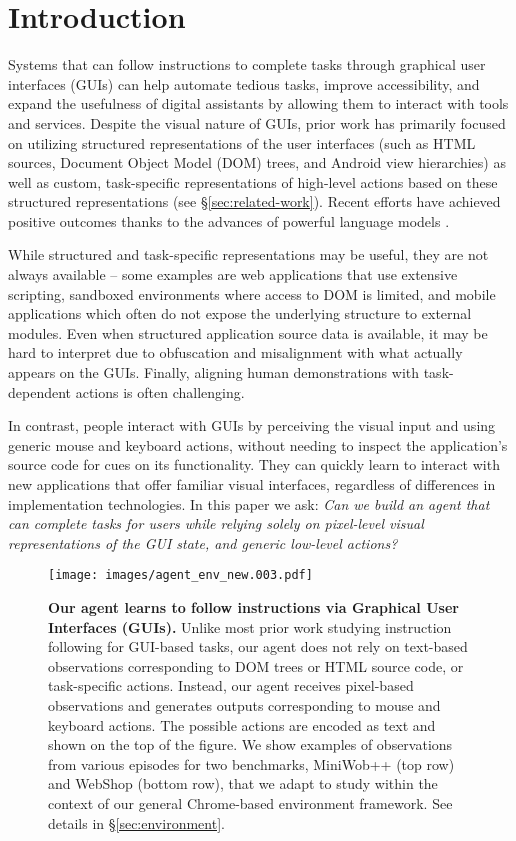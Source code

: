 \section{Introduction}
\label{sec:introduction}

Systems that can follow instructions to complete tasks through graphical user interfaces (GUIs) can help automate tedious tasks,
improve accessibility, and expand the usefulness of digital assistants by allowing them to interact with tools and services.
Despite the visual nature of GUIs, prior work has primarily focused on utilizing structured representations of the user interfaces (such as HTML sources, Document Object Model (DOM) trees, and Android view hierarchies) as well as custom, task-specific representations of high-level actions based on these structured representations (see \S\ref{sec:related-work}).
Recent efforts have achieved positive outcomes thanks to the advances of powerful language models \citep{gur2022understanding,kim2023language, yao2022webshop}.

While structured and task-specific representations may be useful, they are not always available -- some examples are web applications that use extensive scripting, sandboxed environments where access to DOM is limited, and mobile applications which often do not expose the underlying structure to external modules. Even when structured application source data is available, it may be hard to interpret due to obfuscation and misalignment with what actually appears on the GUIs.
Finally, aligning human demonstrations with task-dependent actions is often challenging.

In contrast, people interact with GUIs by perceiving the visual input and using generic mouse and keyboard actions, without needing to inspect the application's source code for cues on its functionality. They can quickly learn to interact with new applications that offer familiar visual interfaces, regardless of differences in implementation technologies. In this paper we ask: \emph{Can we build an agent that can complete tasks for users while relying solely on pixel-level visual representations of the GUI state, and generic low-level actions?}

\begin{figure}[t!]
    \centering
    \texttt{[image: images/agent\_env\_new.003.pdf]}
    \caption{\textbf{Our agent learns to follow instructions via Graphical User Interfaces (GUIs).} Unlike most prior work studying instruction following for GUI-based tasks, our agent does not rely on text-based observations corresponding to DOM trees or HTML source code, or task-specific actions. Instead, our agent receives pixel-based observations and generates outputs corresponding to mouse and keyboard actions. The possible actions are encoded as text and shown on the top of the figure. We show examples of observations from various episodes for two benchmarks, MiniWob++ (top row) and WebShop (bottom row), that we adapt to study within the context of our general Chrome-based environment framework. See details in \S\ref{sec:environment}.} 
    \label{fig:agent_env}
\end{figure}

